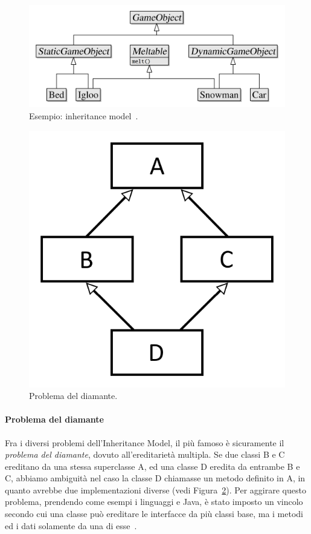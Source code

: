 \begin{figure}[!ht]
    \centering
    \includegraphics[width=0.95\columnwidth]{gfx/imgs/chapter1/InheritanceModel.png}
    \caption{Esempio: inheritance model~\cite{article:game-architecture-models}.}
    \label{fig:inheritance-model}
\end{figure}

\begin{figure}[!ht] 
    \centering
    \includegraphics[width=0.50\columnwidth]{gfx/imgs/chapter1/DiamondProblem.png}
    \caption{Problema del diamante.}
    \label{fig:diamond-problem}
\end{figure}

\paragraph{Problema del diamante}
Fra i diversi problemi dell'Inheritance Model, il più famoso è sicuramente il \emph{problema del diamante}, dovuto all'ereditarietà multipla. Se due classi B e C ereditano da una stessa superclasse A, ed una classe D eredita da entrambe B e C, abbiamo ambiguità nel caso la classe D chiamasse un metodo definito in A, in quanto avrebbe due implementazioni diverse (vedi Figura~\ref{fig:diamond-problem}). Per aggirare questo problema, prendendo come esempi i linguaggi \Csh{} e Java, è stato imposto un vincolo secondo cui una classe può ereditare le interfacce da più classi base, ma i metodi ed i dati solamente da una di esse~\cite{article:diamond-problem,itwiki:99605337}.

